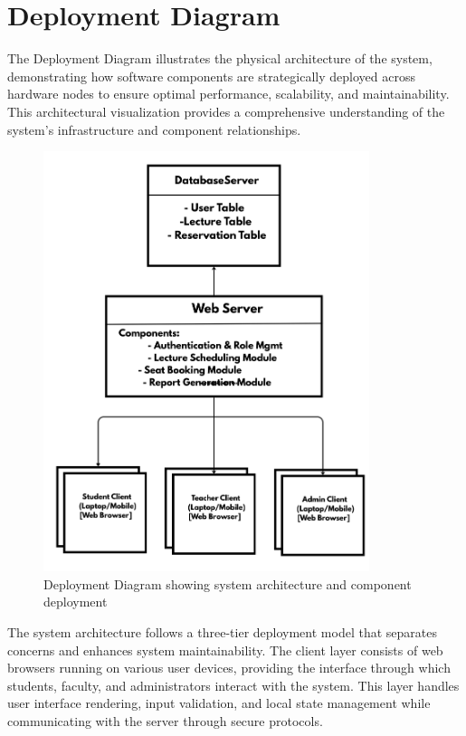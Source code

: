 \section{Deployment Diagram}

The Deployment Diagram illustrates the physical architecture of the system, demonstrating how software components are strategically deployed across hardware nodes to ensure optimal performance, scalability, and maintainability. This architectural visualization provides a comprehensive understanding of the system's infrastructure and component relationships.

\begin{figure}[H]
    \centering
    \includegraphics[width=0.85\textwidth]{images/Deployment Diagram.jpg}
    \caption{Deployment Diagram showing system architecture and component deployment}
    \label{fig:deployment}
\end{figure}

The system architecture follows a three-tier deployment model that separates concerns and enhances system maintainability. The client layer consists of web browsers running on various user devices, providing the interface through which students, faculty, and administrators interact with the system. This layer handles user interface rendering, input validation, and local state management while communicating with the server through secure protocols.

